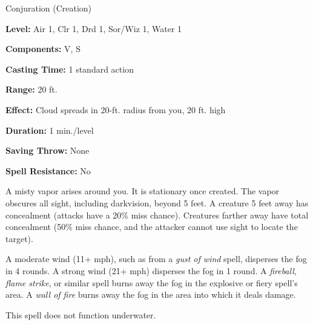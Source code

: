 
Conjuration (Creation)

\textbf{Level:} Air 1, Clr 1, Drd 1, Sor/Wiz 1, Water 1

\textbf{Components:} V, S

\textbf{Casting Time:} 1 standard action

\textbf{Range:} 20 ft.

\textbf{Effect:} Cloud spreads in 20-ft. radius from you, 20 ft. high

\textbf{Duration:} 1 min./level

\textbf{Saving Throw:} None

\textbf{Spell Resistance:} No

A misty vapor arises around you. It is stationary once created. The vapor obscures 
all sight, including darkvision, beyond 5 feet. A creature 5 feet away has concealment 
(attacks have a 20\% miss chance). Creatures farther away have total concealment 
(50\% miss chance, and the attacker cannot use sight to locate the target).

A moderate wind (11+ mph), such as from a \textit{gust of wind} spell, disperses 
the fog in 4 rounds. A strong wind (21+ mph) disperses the fog in 1 round. A \textit{fireball, 
flame strike}, or similar spell burns away the fog in the explosive or fiery spell's 
area. A \textit{wall of fire} burns away the fog in the area into which it deals 
damage.

This spell does not function underwater.

